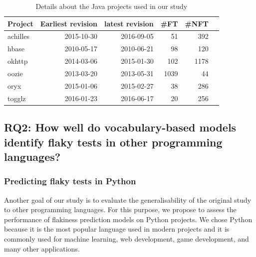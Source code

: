 \begin{table}
\centering
\vspace{1.0em}
\caption{Details about the Java projects used in our study}
\label{javaInfo}
 \begin{tabular}{l|r r r r r} 
 \hline
 \textbf{Project} & \textbf{Earliest revision} & \textbf{latest revision} &\textbf{ \#FT} & \textbf{\#NFT} \\ [0.25ex]
 \hline
 achilles & 2015-10-30 & 2016-09-05 & 51 & 392 \\
 hbase & 2010-05-17 & 2010-06-21 & 98 & 120\\
 okhttp & 2014-03-06 & 2015-01-30 & 102 & 1178\\
 oozie & 2013-03-20 & 2013-05-31 & 1039 & 44 \\
 oryx & 2015-01-06 & 2015-02-27 & 38 & 286 \\ 
 togglz & 2016-01-23 & 2016-06-17 & 20 & 256 \\ 
 \hline
\end{tabular}
\vspace{1.0em}
\end{table}



\subsection{RQ2: How well do vocabulary-based models identify flaky tests in other programming languages?}
\subsubsection{Predicting flaky tests in Python}
Another goal of our study is to evaluate the generalisability of the original study to other programming languages. 
For this purpose, we propose to assess the performance of flakiness prediction models on Python projects. 
We chose Python because it is the most popular language used in modern projects and it is commonly used for machine learning, web development, game development, and many other applications. 

